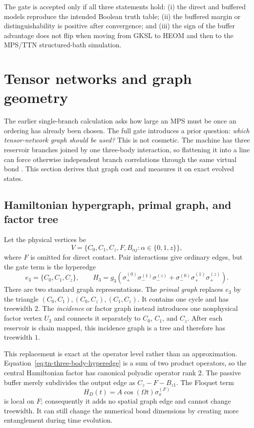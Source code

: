 \documentclass[11pt,a4paper]{article}
\theoremstyle{plain}
\theoremstyle{definition}
\theoremstyle{remark}
\begin{document}
The gate is accepted only if all three statements hold: (i) the direct
and buffered models reproduce the intended Boolean truth table; (ii) the
buffered margin or distinguishability is positive after convergence; and
(iii) the sign of the buffer advantage does not flip when moving from
GKSL to HEOM and then to the MPS/TTN structured-bath simulation.

\section{Tensor networks and graph geometry}
\label{sec:tn-graph}

The earlier single-branch calculation asks how large an MPS must be once
an ordering has already been chosen.  The full gate introduces a prior
question: \emph{which tensor-network graph should be used?}  This is not
cosmetic.  The machine has three reservoir branches joined by one
three-body interaction, so flattening it into a line can force otherwise
independent branch correlations through the same virtual bond
\cite{Schollwock2011,Orus2014}.  This
section derives that graph cost and measures it on exact evolved states.

\subsection{Hamiltonian hypergraph, primal graph, and factor tree}
Let the physical vertices be
\begin{equation}
 V=\{C_0,C_1,C_z,F,B_{\alpha j}:\alpha\in\{0,1,z\}\},
 \label{eq:tn-vertices}
\end{equation}
where $F$ is omitted for direct contact.  Pair interactions give ordinary
edges, but the gate term is the hyperedge
\begin{equation}
 e_3=\{C_0,C_1,C_z\},\qquad
 H_3=g_3\left(\sigma_+^{(0)}\sigma_-^{(1)}\sigma_-^{(z)}
 +\sigma_-^{(0)}\sigma_+^{(1)}\sigma_+^{(z)}\right).
 \label{eq:tn-three-body-hyperedge}
\end{equation}
There are two standard graph representations.  The \emph{primal graph}
replaces $e_3$ by the triangle
$(C_0,C_1),(C_0,C_z),(C_1,C_z)$.  It contains one cycle and has treewidth
$2$.  The \emph{incidence} or factor graph instead introduces one
nonphysical factor vertex $U_3$ and connects it separately to
$C_0$, $C_1$, and $C_z$.  After each reservoir is chain mapped,
this incidence graph is a tree and therefore has treewidth $1$.

This replacement is exact at the operator level rather than an
approximation.  Equation~\eqref{eq:tn-three-body-hyperedge} is a sum of
two product operators, so the central Hamiltonian factor has canonical
polyadic operator rank $2$.  The passive buffer merely subdivides the
output edge as $C_z-F-B_{z1}$.  The Floquet term
\begin{equation}
 H_D(t)=A\cos(\Omega t)\sigma_x^{(F)}
 \label{eq:tn-local-floquet-factor}
\end{equation}
is local on $F$; consequently it adds no spatial graph edge and cannot
change treewidth.  It can still change the numerical bond dimensions by
creating more entanglement during time evolution.
\end{document}
